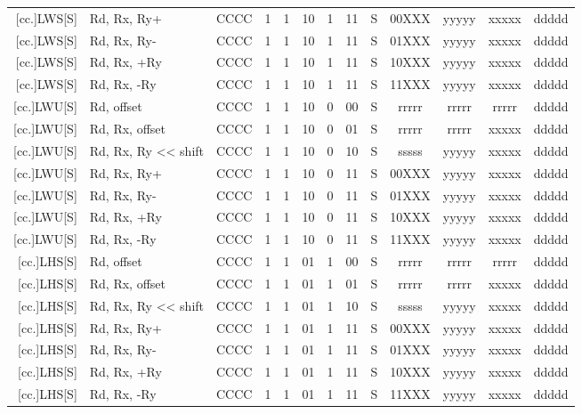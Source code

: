 \documentclass{article}
\begin{document}
\begin{longtable}{|r|l|c|c|c|c|c|c|c|ccc|c|}
        {[}cc.]LWS[S] & Rd, Rx, Ry+ & CCCC & 1 & 1 & 10 & 1 & 11 & S & 00XXX & yyyyy & xxxxx & ddddd \\
        {[}cc.]LWS[S] & Rd, Rx, Ry- & CCCC & 1 & 1 & 10 & 1 & 11 & S & 01XXX & yyyyy & xxxxx & ddddd \\
        {[}cc.]LWS[S] & Rd, Rx, +Ry & CCCC & 1 & 1 & 10 & 1 & 11 & S & 10XXX & yyyyy & xxxxx & ddddd \\
        {[}cc.]LWS[S] & Rd, Rx, -Ry & CCCC & 1 & 1 & 10 & 1 & 11 & S & 11XXX & yyyyy & xxxxx & ddddd \\
        \hline %
        {[}cc.]LWU[S] & Rd, offset & CCCC & 1 & 1 & 10 & 0 & 00 & S & rrrrr & rrrrr & rrrrr & ddddd \\
        {[}cc.]LWU[S] & Rd, Rx, offset & CCCC & 1 & 1 & 10 & 0 & 01 & S & rrrrr & rrrrr & xxxxx & ddddd \\
        {[}cc.]LWU[S] & Rd, Rx, Ry << shift & CCCC & 1 & 1 & 10 & 0 & 10 & S & sssss & yyyyy & xxxxx & ddddd \\
        {[}cc.]LWU[S] & Rd, Rx, Ry+ & CCCC & 1 & 1 & 10 & 0 & 11 & S & 00XXX & yyyyy & xxxxx & ddddd \\
        {[}cc.]LWU[S] & Rd, Rx, Ry- & CCCC & 1 & 1 & 10 & 0 & 11 & S & 01XXX & yyyyy & xxxxx & ddddd \\
        {[}cc.]LWU[S] & Rd, Rx, +Ry & CCCC & 1 & 1 & 10 & 0 & 11 & S & 10XXX & yyyyy & xxxxx & ddddd \\
        {[}cc.]LWU[S] & Rd, Rx, -Ry & CCCC & 1 & 1 & 10 & 0 & 11 & S & 11XXX & yyyyy & xxxxx & ddddd \\
        \hline %
        {[}cc.]LHS[S] & Rd, offset & CCCC & 1 & 1 & 01 & 1 & 00 & S & rrrrr & rrrrr & rrrrr & ddddd \\
        {[}cc.]LHS[S] & Rd, Rx, offset & CCCC & 1 & 1 & 01 & 1 & 01 & S & rrrrr & rrrrr & xxxxx & ddddd \\
        {[}cc.]LHS[S] & Rd, Rx, Ry << shift & CCCC & 1 & 1 & 01 & 1 & 10 & S & sssss & yyyyy & xxxxx & ddddd \\
        {[}cc.]LHS[S] & Rd, Rx, Ry+ & CCCC & 1 & 1 & 01 & 1 & 11 & S & 00XXX & yyyyy & xxxxx & ddddd \\
        {[}cc.]LHS[S] & Rd, Rx, Ry- & CCCC & 1 & 1 & 01 & 1 & 11 & S & 01XXX & yyyyy & xxxxx & ddddd \\
        {[}cc.]LHS[S] & Rd, Rx, +Ry & CCCC & 1 & 1 & 01 & 1 & 11 & S & 10XXX & yyyyy & xxxxx & ddddd \\
        {[}cc.]LHS[S] & Rd, Rx, -Ry & CCCC & 1 & 1 & 01 & 1 & 11 & S & 11XXX & yyyyy & xxxxx & ddddd \\

\end{longtable}
\end{document}
